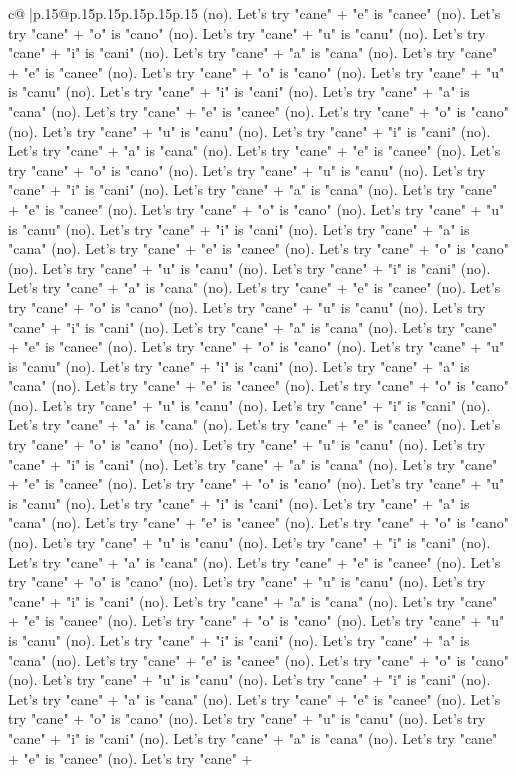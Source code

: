 \documentclass{article}
\begin{document}
{\begin{supertabular}{c@{$\;$}|p{.15\linewidth}@{}p{.15\linewidth}p{.15\linewidth}p{.15\linewidth}p{.15\linewidth}p{.15\linewidth}}
{{{(no). Let's try "cane" + "e" is "canee" (no). Let's try "cane" + "o" is "cano" (no). Let's try "cane" + "u" is "canu" (no). Let's try "cane" + "i" is "cani" (no). Let's try "cane" + "a" is "cana" (no). Let's try "cane" + "e" is "canee" (no). Let's try "cane" + "o" is "cano" (no). Let's try "cane" + "u" is "canu" (no). Let's try "cane" + "i" is "cani" (no). Let's try "cane" + "a" is "cana" (no). Let's try "cane" + "e" is "canee" (no). Let's try "cane" + "o" is "cano" (no). Let's try "cane" + "u" is "canu" (no). Let's try "cane" + "i" is "cani" (no). Let's try "cane" + "a" is "cana" (no). Let's try "cane" + "e" is "canee" (no). Let's try "cane" + "o" is "cano" (no). Let's try "cane" + "u" is "canu" (no). Let's try "cane" + "i" is "cani" (no). Let's try "cane" + "a" is "cana" (no). Let's try "cane" + "e" is "canee" (no). Let's try "cane" + "o" is "cano" (no). Let's try "cane" + "u" is "canu" (no). Let's try "cane" + "i" is "cani" (no). Let's try "cane" + "a" is "cana" (no). Let's try "cane" + "e" is "canee" (no). Let's try "cane" + "o" is "cano" (no). Let's try "cane" + "u" is "canu" (no). Let's try "cane" + "i" is "cani" (no). Let's try "cane" + "a" is "cana" (no). Let's try "cane" + "e" is "canee" (no). Let's try "cane" + "o" is "cano" (no). Let's try "cane" + "u" is "canu" (no). Let's try "cane" + "i" is "cani" (no). Let's try "cane" + "a" is "cana" (no). Let's try "cane" + "e" is "canee" (no). Let's try "cane" + "o" is "cano" (no). Let's try "cane" + "u" is "canu" (no). Let's try "cane" + "i" is "cani" (no). Let's try "cane" + "a" is "cana" (no). Let's try "cane" + "e" is "canee" (no). Let's try "cane" + "o" is "cano" (no). Let's try "cane" + "u" is "canu" (no). Let's try "cane" + "i" is "cani" (no). Let's try "cane" + "a" is "cana" (no). Let's try "cane" + "e" is "canee" (no). Let's try "cane" + "o" is "cano" (no). Let's try "cane" + "u" is "canu" (no). Let's try "cane" + "i" is "cani" (no). Let's try "cane" + "a" is "cana" (no). Let's try "cane" + "e" is "canee" (no). Let's try "cane" + "o" is "cano" (no). Let's try "cane" + "u" is "canu" (no). Let's try "cane" + "i" is "cani" (no). Let's try "cane" + "a" is "cana" (no). Let's try "cane" + "e" is "canee" (no). Let's try "cane" + "o" is "cano" (no). Let's try "cane" + "u" is "canu" (no). Let's try "cane" + "i" is "cani" (no). Let's try "cane" + "a" is "cana" (no). Let's try "cane" + "e" is "canee" (no). Let's try "cane" + "o" is "cano" (no). Let's try "cane" + "u" is "canu" (no). Let's try "cane" + "i" is "cani" (no). Let's try "cane" + "a" is "cana" (no). Let's try "cane" + "e" is "canee" (no). Let's try "cane" + "o" is "cano" (no). Let's try "cane" + "u" is "canu" (no). Let's try "cane" + "i" is "cani" (no). Let's try "cane" + "a" is "cana" (no). Let's try "cane" + "e" is "canee" (no). Let's try "cane" + "o" is "cano" (no). Let's try "cane" + "u" is "canu" (no). Let's try "cane" + "i" is "cani" (no). Let's try "cane" + "a" is "cana" (no). Let's try "cane" + "e" is "canee" (no). Let's try "cane" + "o" is "cano" (no). Let's try "cane" + "u" is "canu" (no). Let's try "cane" + "i" is "cani" (no). Let's try "cane" + "a" is "cana" (no). Let's try "cane" + "e" is "canee" (no). Let's try "cane" + }}}
\end{supertabular}}
\end{document}
